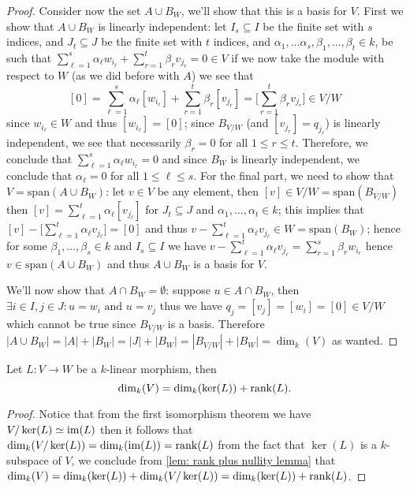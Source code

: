 \begin{proof}
  Consider now the set \(A \cup B_W\), we'll show that this is a basis for
  \(V\). First we show that \(A \cup B_W\) is linearly independent: let \(I_s
  \subseteq I\) be the finite set with \(s\) indices, and \(J_t \subseteq J\) be
  the finite set with \(t\) indices, and \(\alpha_1, \dots \alpha_s, \beta_1,
  \dots, \beta_t \in k\), be such that \(\sum_{\ell=1}^s \alpha_\ell w_{i_\ell}
  + \sum_{r=1}^t \beta_r v_{j_r} = 0 \in V\) if we now take the module with
  respect to \(W\) (as we did before with \(A\)) we see that
  \[
    [0] = \sum_{\ell=1}^s\alpha_\ell [w_{i_\ell}]
    + \sum_{r=1}^t \beta_r [v_{j_r}] = \bigg[\sum_{r=1}^t \beta_r v_{j_r}\bigg]
    \in V/W
  \]
  since \(w_{i_\ell} \in W\) and thus \([w_{i_\ell}] = [0]\); since \(B_{V/W}\)
  (and \([v_{j_r}] = q_{j_r}\)) is linearly independent, we see that
  necessarily \(\beta_r = 0\) for all \(1 \leq r \leq t\). Therefore, we
  conclude that \(\sum_{\ell=1}^s \alpha_\ell w_{i_\ell} = 0\) and since \(B_W\)
  is linearly independent, we conclude that \(\alpha_{\ell} = 0\) for all  \(1
  \leq \ell \leq s\). For the final part, we need to show that \(V =
  \mathrm{span}(A \cup B_{W})\): let \(v \in V\) be any element, then \([v] \in
  V/W = \mathrm{span}(B_{V/W})\) then \([v] = \sum_{\ell=1}^t \alpha_\ell
  [v_{j_\ell}]\) for \(J_t \subseteq J\) and \(\alpha_1, \dots, \alpha_t \in
  k\); this implies that \([v] - \big[ \sum_{\ell=1}^t \alpha_\ell v_{j_\ell}
  \big] = [0]\) and thus \(v - \sum_{\ell=1}^t \alpha_\ell v_{j_\ell} \in W =
  \mathrm{span}(B_{W})\); hence for some \(\beta_1, \dots, \beta_s \in k\) and
  \(I_s \subseteq I\) we have \(v - \sum_{\ell=1}^t \alpha_\ell v_{j_\ell} =
  \sum_{r=1}^s \beta_r w_{i_r}\) hence \(v \in \mathrm{span}(A \cup B_{W})\) and
  thus \(A \cup B_W\) is a basis for \(V\).

  We'll now show that \(A \cap B_W = \emptyset\): suppose \(u \in A \cap B_W\),
  then \(\exists i \in I, j \in J : u = w_i \text{ and } u = v_j\) thus we have
  \(q_j = [v_j] = [w_i] = [0] \in V/W\) which cannot be true since \(B_{V/W}\)
  is a basis. Therefore \(|A \cup B_W| = |A| + |B_W| = |J| + |B_W| =  |B_{V/W}|
  + |B_W| = \dim_k(V)\) as wanted.
\end{proof}

\begin{theorem}\label{thm: rank plus nullity}
  Let \(L : V \to W\) be a \(k\)-linear morphism, then
  \[
    \dim_k(V) = \dim_k(\ker(L)) + \operatorname{rank}(L).
  \]
\end{theorem}

\begin{proof}
  Notice that from the first isomorphism theorem we have \(V/\ker(L) \simeq
  \operatorname{im}(L)\) then it follows that \(\dim_k(V/\ker(L)) = \dim_k(\operatorname{im}(L)) =
  \operatorname{rank}(L)\) from the fact that \(\ker(L)\) is a \(k\)-subspace of \(V\), we
  conclude from \cref{lem: rank plus nullity lemma} that \(\dim_k(V) =
  \dim_k(\ker(L)) + \dim_k(V/\ker(L)) = \dim_k(\ker(L)) + \operatorname{rank}(L)\).
\end{proof}

